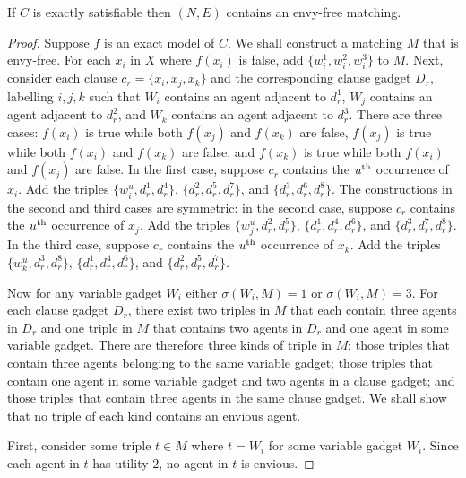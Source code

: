 \begin{lem}
\label{lem:threed_efr_as_regularenvy_firstdirection}
If $C$ is exactly satisfiable then $(N, E)$ contains an envy-free matching.
\end{lem}
\begin{proof}
Suppose $f$ is an exact model of $C$. We shall construct a matching $M$ that is envy-free. For each $x_i$ in $X$ where $f(x_i)$ is false, add $\{ w_i^1, w_i^2, w_i^3 \}$ to $M$. Next, consider each clause $c_r = \{ x_i, x_j, x_k \}$ and the corresponding clause gadget $D_r$, labelling $i, j, k$ such that $W_i$ contains an agent adjacent to $d_r^1$, $W_j$ contains an agent adjacent to $d_r^2$, and $W_k$ contains an agent adjacent to $d_r^3$. There are three cases: $f(x_i)$ is true while both $f(x_j)$ and $f(x_k)$ are false, $f(x_j)$ is true while both $f(x_i)$ and $f(x_k)$ are false, and $f(x_k)$ is true while both $f(x_i)$ and $f(x_j)$ are false. In the first case, suppose $c_r$ contains the $u\textsuperscript{th}$ occurrence of $x_i$. Add the triples $\{ w_i^u, d_r^1, d_r^4 \}$, $\{ d_r^2, d_r^5, d_r^7 \}$, and $\{ d_r^3, d_r^6, d_r^8 \}$. The constructions in the second and third cases are symmetric: in the second case, suppose $c_r$ contains the $u\textsuperscript{th}$ occurrence of $x_j$. Add the triples $\{ w_j^u, d_r^2, d_r^5 \}$, $\{ d_r^1, d_r^4, d_r^6 \}$, and $\{ d_r^3, d_r^7, d_r^8 \}$. In the third case, suppose $c_r$ contains the $u\textsuperscript{th}$ occurrence of $x_k$. Add the triples $\{ w_k^u, d_r^3, d_r^8 \}$, $\{ d_r^1, d_r^4, d_r^6 \}$, and $\{ d_r^2, d_r^5, d_r^7 \}$.

Now for any variable gadget $W_i$ either $\sigma(W_i, M) = 1$ or $\sigma(W_i, M) = 3$. For each clause gadget $D_r$, there exist two triples in $M$ that each contain three agents in $D_r$ and one triple in $M$ that contains two agents in $D_r$ and one agent in some variable gadget. There are therefore three kinds of triple in $M$: those triples that contain three agents belonging to the same variable gadget; those triples that contain one agent in some variable gadget and two agents in a clause gadget; and those triples that contain three agents in the same clause gadget. We shall show that no triple of each kind contains an envious agent.

First, consider some triple $t\in M$ where $t=W_i$ for some variable gadget $W_i$. Since each agent in $t$ has utility $2$, no agent in $t$ is envious.


\end{proof}
